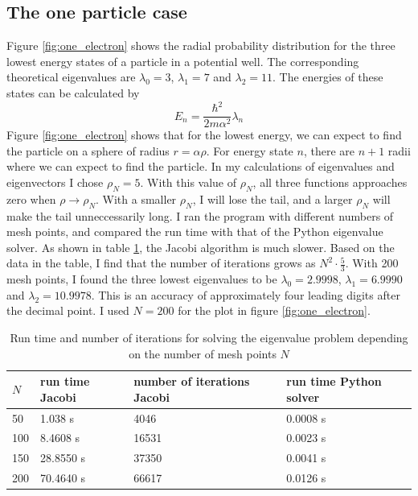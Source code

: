 \documentclass{article}
\begin{document}
\subsection{The one particle case}
Figure \ref{fig:one_electron} shows the radial probability distribution for the three lowest energy states of a particle in a potential well. The corresponding theoretical eigenvalues are $\lambda_0=3$, $\lambda_1=7$ and $\lambda_2 =11$. The energies of these states can be calculated by 
$$E_n=\frac{{\hbar}^2}{2m{\alpha}^2}{\lambda}_n$$ 
Figure \ref{fig:one_electron} shows that for the lowest energy, we can expect to find the particle on a sphere of radius $r=\alpha \rho$. For energy state $n$, there are $n+1$ radii where we can expect to find the particle.
In my calculations of eigenvalues and eigenvectors I chose $\rho_N=5$. With this value of $\rho_N$, all three functions approaches zero when $\rho\rightarrow \rho_N$. With a smaller $\rho_N$, I will lose the tail, and a larger $\rho_N$ will make the tail unneccessarily long.  
I ran the program with different numbers of mesh points, and compared the run time with that of the Python eigenvalue solver. As shown in table \ref{tab:table1}, the Jacobi algorithm is much slower. Based on the data in the table, I find that the number of iterations grows as $N^2 \cdot \frac{5}{3}$.
 With 200 mesh points, I found the three lowest eigenvalues to be $\lambda_0=2.9998$, $\lambda_1=6.9990$ and $\lambda_2 =10.9978$. This is an accuracy of approximately four leading digits after the decimal point. I used $N=200$ for the plot in figure \ref{fig:one_electron}.

\begin{table}[h!]
  \centering
  \caption{Run time and number of iterations for solving the eigenvalue problem depending on the number of mesh points $N$}
  \label{tab:table1}
  \begin{tabular}{l||l|l|l}
   $N$ & run time Jacobi & number of iterations Jacobi & run time Python solver\\

    \hline
    50  & 1.038 s & 4046 & 0.0008 s \\
    \hline
    100 & 8.4608 s & 16531 & 0.0023 s \\
    \hline
     150 & 28.8550 s & 37350 & 0.0041 s \\
	\hline
	200 & 70.4640 s & 66617 & 0.0126 s \\
  \end{tabular}
\end{table}
\end{document}
